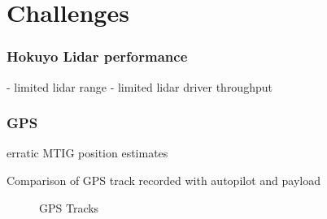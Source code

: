 \documentclass[a4paper,11pt]{report}
\begin{document}
\chapter{Challenges}

\subsection{Hokuyo Lidar performance}

- limited lidar range
- limited lidar driver throughput

\subsection{GPS}

erratic MTIG position estimates

Comparison of GPS track recorded with autopilot and payload

\begin{figure}[ht]
  \centering
  \caption{GPS Tracks}
  \label{fig:track_comp}
\end{figure} 
\end{document}
